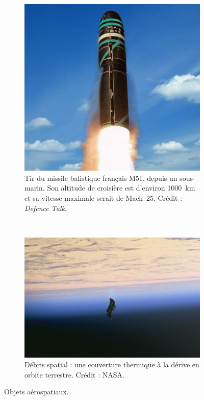 \begin{appendices}
	\begin{figure}[htbp]
        \begin{subfigure}[t]{0.41\textwidth}
            \centering
            \includegraphics[width=\textwidth]{figures/ch1/m51}
        	\caption[Missile français M51]{Tir du missile balistique français M51, depuis un sous-marin. Son altitude de croisière est d'environ 1000~km et sa vitesse maximale serait de Mach~25\footnotemark. Crédit : \emph{Defence Talk}\footnotemark.}
            \label{fig:m51}
        \end{subfigure}
        ~
        \begin{subfigure}[t]{0.57\textwidth}
            \centering
            \includegraphics[width=\textwidth]{figures/ch1/space_debris_zoom}
            \caption[Débris spatial]{Débris spatial : une couverture thermique à la dérive en orbite terrestre. Crédit : NASA\protect\footnotemark.}
            \label{fig:spaceDeb}
        \end{subfigure}
        \label{fig:aerospace}
        \caption{Objets aérospatiaux.}
	\end{figure}
	

\end{appendices}
